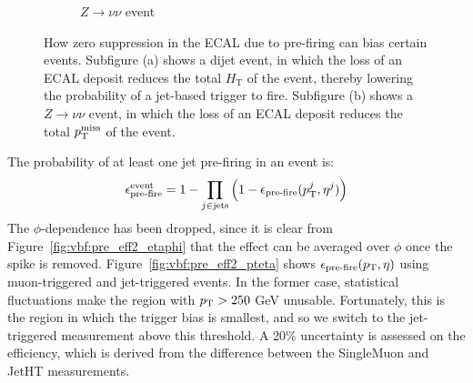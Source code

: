\begin{figure}[]
\begin{center}
\begin{subfigure}[t]{0.49\textwidth}
            \caption{$Z\rightarrow\nu\nu$ event}
        \end{subfigure}
        \caption{How zero suppression in the ECAL due to pre-firing can bias certain events.
                 Subfigure (a) shows a dijet event, in which the loss of an ECAL deposit reduces the total $H_\mathrm{T}$ of the event, thereby lowering the probability of a jet-based trigger to fire.
                 Subfigure (b) shows a $Z\rightarrow\nu\nu$ event, in which the loss of an ECAL deposit reduces the total $p_\mathrm{T}^\mathrm{miss}$ of the event.}
        \label{fig:vbf:pre_diag}
    \end{center}
\end{figure}

The probability of at least one jet pre-firing in an event is:
\begin{equation}
    \epsilon_\text{pre-fire}^\text{event} = 1 - \prod_{j\in\text{jets}}  \left(1-\epsilon_\text{pre-fire}(p_\mathrm{T}^j,\eta^j)\right)
\end{equation}
The $\phi$-dependence has been dropped, since it is clear from Figure~\ref{fig:vbf:pre_eff2_etaphi} that the effect can be averaged over $\phi$ once the spike is removed. 
Figure~\ref{fig:vbf:pre_eff2_pteta} shows $\epsilon_\text{pre-fire}(p_\mathrm{T},\eta)$ using muon-triggered and jet-triggered events.
In the former case, statistical fluctuations make the region with $p_\mathrm{T}>250$ GeV unusable.
Fortunately, this is the region in which the trigger bias is smallest, and so we switch to the jet-triggered measurement above this threshold.
A 20\% uncertainty is assessed on the efficiency, which is derived from the difference between the SingleMuon and JetHT measurements. 

